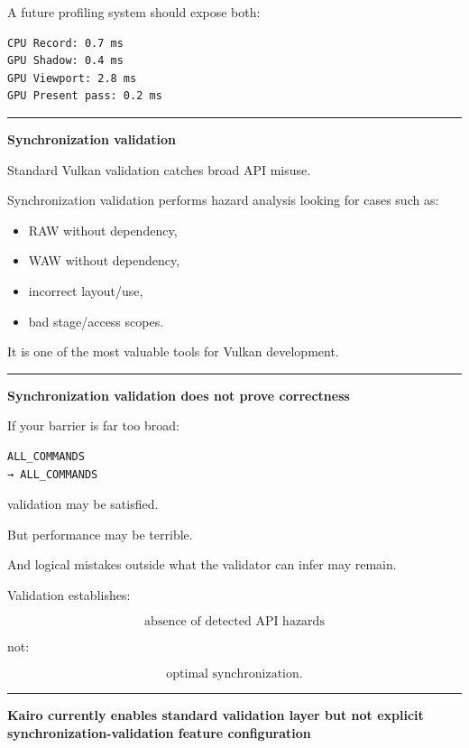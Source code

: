 A future profiling system should expose both:

\begin{verbatim}
CPU Record: 0.7 ms
GPU Shadow: 0.4 ms
GPU Viewport: 2.8 ms
GPU Present pass: 0.2 ms
\end{verbatim}

\begin{center}\rule{0.5\linewidth}{0.5pt}\end{center}

\textbf{Synchronization validation}

Standard Vulkan validation catches broad API misuse.

Synchronization validation performs hazard analysis looking for cases such as:

\begin{itemize}
\tightlist
\item
  RAW without dependency,
\item
  WAW without dependency,
\item
  incorrect layout/use,
\item
  bad stage/access scopes.
\end{itemize}

It is one of the most valuable tools for Vulkan development.

\begin{center}\rule{0.5\linewidth}{0.5pt}\end{center}

\textbf{Synchronization validation does not prove correctness}

If your barrier is far too broad:

\begin{verbatim}
ALL_COMMANDS
→ ALL_COMMANDS
\end{verbatim}

validation may be satisfied.

But performance may be terrible.

And logical mistakes outside what the validator can infer may remain.

Validation establishes:

\[
\boxed{
\text{absence of detected API hazards}
}
\]

not:

\[
\text{optimal synchronization}.
\]

\begin{center}\rule{0.5\linewidth}{0.5pt}\end{center}

\textbf{Kairo currently enables standard validation layer but not explicit synchronization-validation feature configuration}

